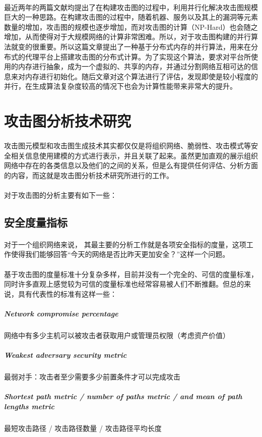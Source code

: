 \documentclass[12pt,a4paper]{article}
\begin{document}
\paragraph{}
最近两年的两篇文献\cite{14}\cite{15}均提出了在构建攻击图的过程中，利用并行化解决攻击图规模巨大的一种思路。在构建攻击图的过程中，随着机器、服务以及其上的漏洞等元素数量的增加，攻击图的规模也逐步增加，而对攻击图的计算（NP-Hard）也会随之增加，从而使得对于大规模网络的计算非常困难。所以，对于攻击图构建的并行算法就变的很重要。所以这篇文章提出了一种基于分布式内存的并行算法，用来在分布式的代理平台上搭建攻击图的分布式计算。为了实现这个算法，要求对平台所使用的内存进行抽象，成为一个虚拟的、共享的内存，并通过分割网络互相可达的信息来对内存进行初始化。随后文章对这个算法进行了评估，发现即使是较小程度的并行，在生成算法复杂度较高的情况下也会为计算性能带来非常大的提升。

\section{攻击图分析技术研究}
\paragraph{}
攻击图元模型和攻击图生成技术其实都仅仅是将组织网络、脆弱性、攻击模式等安全相关信息使用建模的方式进行表示，并且关联了起来。虽然更加直观的展示组织网络中存在的各类信息以及他们的之间的关系，但是么有提供任何评估、分析方面的内容，而这就是攻击图分析技术研究所进行的工作。

\paragraph{}
对于攻击图的分析主要有如下一些：

\subsection{安全度量指标}
\paragraph{}
对于一个组织网络来说， 其最主要的分析工作就是各项安全指标的度量，这项工作使得我们能够回答“今天的网络是否比昨天更加安全？”这样一个问题。
\paragraph{}
基于攻击图的度量标准十分复杂多样，目前并没有一个完全的、可信的度量标准，同时许多直观上感觉较为可信的度量标准也经常容易被人们不断推翻。但总的来说，具有代表性的标准有这样一些：
\subparagraph{Network compromise percentage\cite{27}}网络中有多少主机可以被攻击者获取用户或管理员权限（考虑资产价值）
\subparagraph{Weakest adversary security metric\cite{28}}最弱对手：攻击者至少需要多少前置条件才可以完成攻击
\subparagraph{Shortest path metric / number of paths metric / and mean of path lengths metric\cite{29}} 最短攻击路径 / 攻击路径数量 / 攻击路径平均长度
\end{document}
